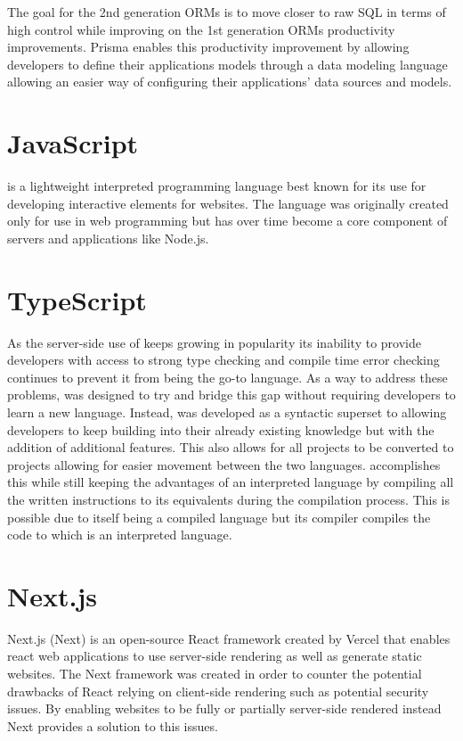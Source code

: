 The goal for the 2nd generation ORMs is to move closer to raw SQL in terms of high control while improving on the 1st generation ORMs productivity improvements. 
Prisma enables this productivity improvement by allowing developers to define their applications models through a data modeling language allowing an easier way of configuring their applications' data sources and models\cite{Prisma_Doc}.

\section*{JavaScript}
\javascript{} is a lightweight interpreted programming language best known for its use for developing interactive elements for websites\cite{JavaScript_Mozilla}.
The language was originally created only for use in web programming but has over time become a core component of servers and applications like Node.js. 


\section*{TypeScript}
As the server-side use of \javascript{} keeps growing in popularity its inability to provide developers with access to strong type checking and compile time error checking continues to prevent it from being the go-to language.
As a way to address these problems, \typescript{} was designed to try and bridge this gap without requiring developers to learn a new language.
Instead, \typescript{} was developed as a syntactic superset to \javascript{} allowing developers to keep building into their already existing knowledge but with the addition of additional features. 
This also allows for all \javascript{} projects to be converted to \typescript{} projects allowing for easier movement between the two languages\cite{TypeScript}. 
\typescript{} accomplishes this while still keeping the advantages of an interpreted language by compiling all the written instructions to its \javascript{} equivalents during the compilation process. 
This is possible due to \typescript{} itself being a compiled language but its compiler compiles the code to \javascript{} which is an interpreted language. 

\section*{Next.js}
Next.js (Next) is an open-source React framework created by Vercel that enables react web applications to use server-side rendering as well as generate static websites. The Next framework was created in order to counter the potential drawbacks of React relying on client-side rendering such as potential security issues. By enabling websites to be fully or partially server-side rendered instead Next provides a solution to this issues\cite {Nextjs_Docks}. 

